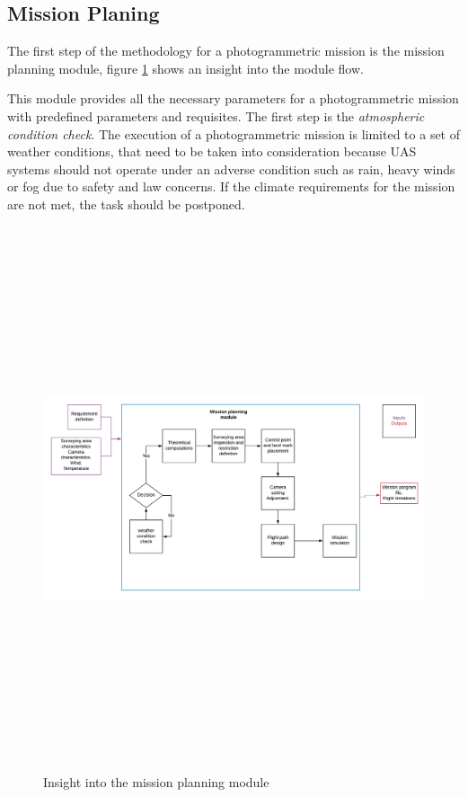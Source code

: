 \subsection{Mission Planing}
The first step of the methodology for a photogrammetric mission is the mission planning module, figure \ref{fig:MissionModule} shows an insight into the module flow.

This module provides all the necessary parameters for a photogrammetric mission with predefined parameters and requisites. The first step is the \textit{atmospheric condition check}. The execution of a photogrammetric mission is limited to a set of weather conditions, that need to be taken into consideration because UAS systems should not operate under an adverse condition such as rain, heavy winds or fog due to safety and law concerns. If the climate requirements for the mission are not met, the task should be postponed.
\begin{figure}[]
\centering
\includegraphics[width=16cm,height=16cm,keepaspectratio]{imagenes/Missionplanning.png}
\caption{Insight into the mission planning module}
\label{fig:MissionModule}
\end{figure}

